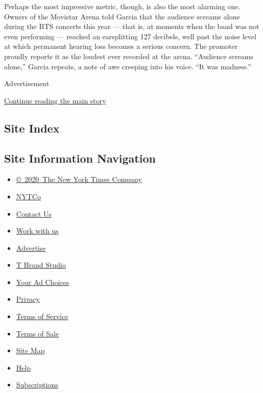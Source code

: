 Perhaps the most impressive metric, though, is also the most alarming
one. Owners of the Movistar Arena told Garcia that the audience screams
alone during the BTS concerts this year --- that is, at moments when the
band was not even performing --- reached an earsplitting 127 decibels,
well past the noise level at which permanent hearing loss becomes a
serious concern. The promoter proudly reports it as the loudest ever
recorded at the arena. ``Audience screams alone,'' Garcia repeats, a
note of awe creeping into his voice. ``It was madness.''

Advertisement

\protect\hyperlink{after-bottom}{Continue reading the main story}

\hypertarget{site-index}{%
\subsection{Site Index}\label{site-index}}

\hypertarget{site-information-navigation}{%
\subsection{Site Information
Navigation}\label{site-information-navigation}}

\begin{itemize}
\tightlist
\item
  \href{https://help.nytimes3xbfgragh.onion/hc/en-us/articles/115014792127-Copyright-notice}{©~2020~The
  New York Times Company}
\end{itemize}

\begin{itemize}
\tightlist
\item
  \href{https://www.nytco.com/}{NYTCo}
\item
  \href{https://help.nytimes3xbfgragh.onion/hc/en-us/articles/115015385887-Contact-Us}{Contact
  Us}
\item
  \href{https://www.nytco.com/careers/}{Work with us}
\item
  \href{https://nytmediakit.com/}{Advertise}
\item
  \href{http://www.tbrandstudio.com/}{T Brand Studio}
\item
  \href{https://www.nytimes3xbfgragh.onion/privacy/cookie-policy\#how-do-i-manage-trackers}{Your
  Ad Choices}
\item
  \href{https://www.nytimes3xbfgragh.onion/privacy}{Privacy}
\item
  \href{https://help.nytimes3xbfgragh.onion/hc/en-us/articles/115014893428-Terms-of-service}{Terms
  of Service}
\item
  \href{https://help.nytimes3xbfgragh.onion/hc/en-us/articles/115014893968-Terms-of-sale}{Terms
  of Sale}
\item
  \href{https://spiderbites.nytimes3xbfgragh.onion}{Site Map}
\item
  \href{https://help.nytimes3xbfgragh.onion/hc/en-us}{Help}
\item
  \href{https://www.nytimes3xbfgragh.onion/subscription?campaignId=37WXW}{Subscriptions}
\end{itemize}
